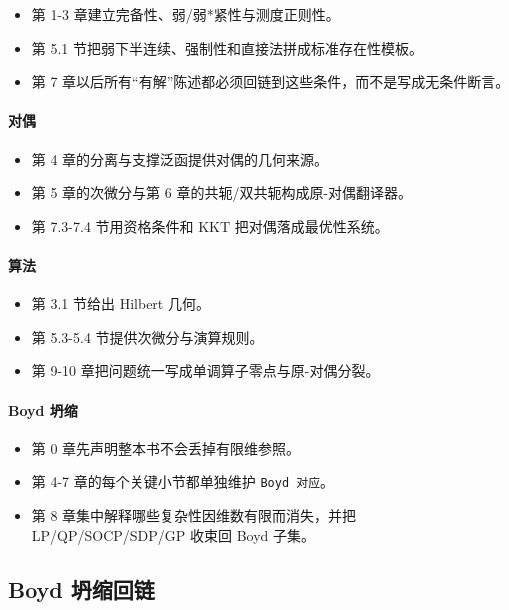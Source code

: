 \begin{itemize}
  \item 第 1-3 章建立完备性、弱/弱*紧性与测度正则性。
  \item 第 5.1 节把弱下半连续、强制性和直接法拼成标准存在性模板。
  \item 第 7 章以后所有“有解”陈述都必须回链到这些条件，而不是写成无条件断言。
\end{itemize}

\paragraph{对偶}

\begin{itemize}
  \item 第 4 章的分离与支撑泛函提供对偶的几何来源。
  \item 第 5 章的次微分与第 6 章的共轭/双共轭构成原-对偶翻译器。
  \item 第 7.3-7.4 节用资格条件和 KKT 把对偶落成最优性系统。
\end{itemize}

\paragraph{算法}

\begin{itemize}
  \item 第 3.1 节给出 Hilbert 几何。
  \item 第 5.3-5.4 节提供次微分与演算规则。
  \item 第 9-10 章把问题统一写成单调算子零点与原-对偶分裂。
\end{itemize}

\paragraph{Boyd 坍缩}

\begin{itemize}
  \item 第 0 章先声明整本书不会丢掉有限维参照。
  \item 第 4-7 章的每个关键小节都单独维护 \texttt{Boyd 对应}。
  \item 第 8 章集中解释哪些复杂性因维数有限而消失，并把 LP/QP/SOCP/SDP/GP 收束回 Boyd 子集。
\end{itemize}

\subsection*{Boyd 坍缩回链}


